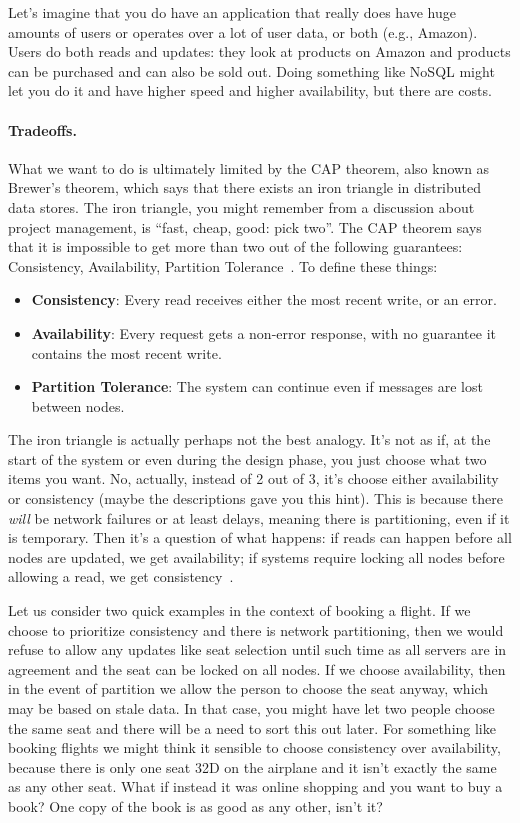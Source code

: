 Let's imagine that you do have an application that really does have huge amounts of users or operates over a lot of user data, or both (e.g., Amazon). Users do both reads and updates: they look at products on Amazon and products can be purchased and can also be sold out. Doing something like NoSQL might let you do it and have higher speed and higher availability, but there are costs. 

\paragraph{Tradeoffs.} What we want to do is ultimately limited by the CAP theorem, also known as Brewer's theorem, which says that there exists an iron triangle in distributed data stores. The iron triangle, you might remember from a discussion about project management, is ``fast, cheap, good: pick two''. The CAP theorem says that it is impossible to get more than two out of the following guarantees: Consistency, Availability, Partition Tolerance~\cite{brewercap}. To define these things:

\begin{itemize}
	\item \textbf{Consistency}: Every read receives either the most recent write, or an error.
	\item \textbf{Availability}: Every request gets a non-error response, with no guarantee it contains the most recent write.
	\item \textbf{Partition Tolerance}: The system can continue even if messages are lost between nodes.
\end{itemize}

The iron triangle is actually perhaps not the best analogy. It's not as if, at the start of the system or even during the design phase, you just choose what two items you want. No, actually, instead of 2 out of 3, it's choose either availability or consistency (maybe the descriptions gave you this hint). This is because there \textit{will} be network failures or at least delays, meaning there is partitioning, even if it is temporary. Then it's a question of what happens: if reads can happen before all nodes are updated, we get availability; if systems require locking all nodes before allowing a read, we get consistency~\cite{bettercap}.

Let us consider two quick examples in the context of booking a flight. If we choose to prioritize consistency and there is network partitioning, then we would refuse to allow any updates like seat selection until such time as all servers are in agreement and the seat can be locked on all nodes. If we choose availability, then in the event of partition we allow the person to choose the seat anyway, which may be based on stale data. In that case, you might have let two people choose the same seat and there will be a need to sort this out later. For something like booking flights we might think it sensible to choose consistency over availability, because there is only one seat 32D on the airplane and it isn't exactly the same as any other seat. What if instead it was online shopping and you want to buy a book? One copy of the book is as good as any other, isn't it?

